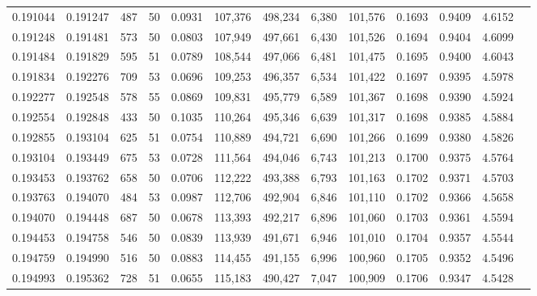 \begin{tabular}{rrrrrrrrrrrrr}
0.191044 & 0.191247 &   487 &  50 &                                     0.0931 & 107,376 & 498,234 &   6,380 & 101,576 & 0.1693 & 0.9409 & 4.6152 \\
0.191248 & 0.191481 &   573 &  50 &                                     0.0803 & 107,949 & 497,661 &   6,430 & 101,526 & 0.1694 & 0.9404 & 4.6099 \\
0.191484 & 0.191829 &   595 &  51 &                                     0.0789 & 108,544 & 497,066 &   6,481 & 101,475 & 0.1695 & 0.9400 & 4.6043 \\
0.191834 & 0.192276 &   709 &  53 &                                     0.0696 & 109,253 & 496,357 &   6,534 & 101,422 & 0.1697 & 0.9395 & 4.5978 \\
0.192277 & 0.192548 &   578 &  55 &                                     0.0869 & 109,831 & 495,779 &   6,589 & 101,367 & 0.1698 & 0.9390 & 4.5924 \\
0.192554 & 0.192848 &   433 &  50 &                                     0.1035 & 110,264 & 495,346 &   6,639 & 101,317 & 0.1698 & 0.9385 & 4.5884 \\
0.192855 & 0.193104 &   625 &  51 &                                     0.0754 & 110,889 & 494,721 &   6,690 & 101,266 & 0.1699 & 0.9380 & 4.5826 \\
0.193104 & 0.193449 &   675 &  53 &                                     0.0728 & 111,564 & 494,046 &   6,743 & 101,213 & 0.1700 & 0.9375 & 4.5764 \\
0.193453 & 0.193762 &   658 &  50 &                                     0.0706 & 112,222 & 493,388 &   6,793 & 101,163 & 0.1702 & 0.9371 & 4.5703 \\
0.193763 & 0.194070 &   484 &  53 &                                     0.0987 & 112,706 & 492,904 &   6,846 & 101,110 & 0.1702 & 0.9366 & 4.5658 \\
0.194070 & 0.194448 &   687 &  50 &                                     0.0678 & 113,393 & 492,217 &   6,896 & 101,060 & 0.1703 & 0.9361 & 4.5594 \\
0.194453 & 0.194758 &   546 &  50 &                                     0.0839 & 113,939 & 491,671 &   6,946 & 101,010 & 0.1704 & 0.9357 & 4.5544 \\
0.194759 & 0.194990 &   516 &  50 &                                     0.0883 & 114,455 & 491,155 &   6,996 & 100,960 & 0.1705 & 0.9352 & 4.5496 \\
0.194993 & 0.195362 &   728 &  51 &                                     0.0655 & 115,183 & 490,427 &   7,047 & 100,909 & 0.1706 & 0.9347 & 4.5428 \\

\end{tabular}
